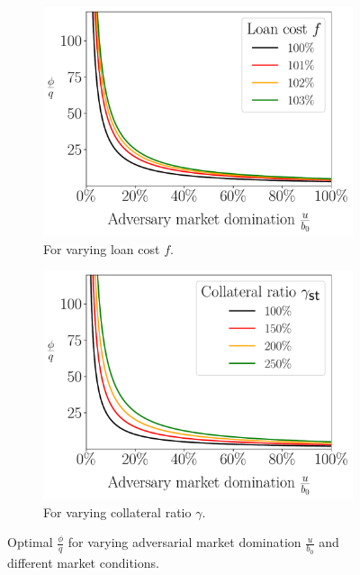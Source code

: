 \begin{figure}[htb]
  \centering
  \begin{subfigure}{0.49\textwidth}
    \includegraphics[width=\textwidth]{./figures/multiplef_plotu.pdf}
    \caption{For varying loan cost $f$.}
    \label{fig:compare-f-plotu}
  \end{subfigure}
  \hfill
  \begin{subfigure}{0.49\textwidth}
    \includegraphics[width=\textwidth]{./figures/multiplegamma_plotu.pdf}
    \caption{For varying collateral ratio $\gamma$.}
    \label{fig:compare-f-plotu}
  \end{subfigure}
  \caption{Optimal $\frac{\phi}{q}$ for varying adversarial market domination
           $\frac{u}{b_0}$ and different market conditions.}
  \label{fig:plotu}
\end{figure}



